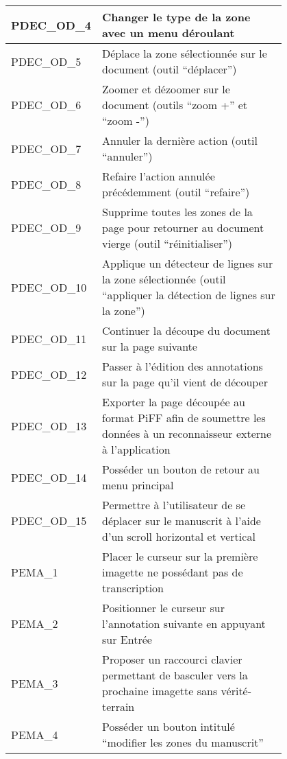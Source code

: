 \begin{center}
\begin{tabular}{ | l | p{0.8\linewidth} | }
        \hline
        \rowcolor{red}PDEC\_OD\_4 & Changer le type de la zone avec un menu déroulant \\
        \hline
        \rowcolor{red}PDEC\_OD\_5 & Déplace la zone sélectionnée sur le document (outil “déplacer”) \\
        \hline
        \rowcolor{red}PDEC\_OD\_6 & Zoomer et dézoomer sur le document (outils “zoom +” et “zoom -”) \\
        \hline
        \rowcolor{red}PDEC\_OD\_7 & Annuler la dernière action (outil “annuler”) \\
        \hline
        \rowcolor{red}PDEC\_OD\_8 & Refaire l’action annulée précédemment (outil “refaire”) \\
        \hline
        \rowcolor{red}PDEC\_OD\_9 & Supprime toutes les zones de la page pour retourner au document vierge (outil “réinitialiser”) \\
        \hline
        \rowcolor{red}PDEC\_OD\_10 & Applique un détecteur de lignes sur la zone sélectionnée (outil “appliquer la détection de lignes sur la zone”) \\
        \hline
        \rowcolor{red}PDEC\_OD\_11 & Continuer la découpe du document sur la page suivante \\
        \hline
        \rowcolor{red}PDEC\_OD\_12 & Passer à l’édition des annotations sur la page qu’il vient de découper \\
        \hline
        \rowcolor{red}PDEC\_OD\_13 & Exporter la page découpée au format PiFF afin de soumettre les données à un reconnaisseur externe à l’application \\
        \hline
        \rowcolor{red}PDEC\_OD\_14 & Posséder un bouton de retour au menu principal \\
        \hline
        \rowcolor{red}PDEC\_OD\_15 & Permettre à l’utilisateur de se déplacer sur le manuscrit à l’aide d’un scroll horizontal et vertical \\
        \hline
        PEMA\_1 & Placer le curseur sur la première imagette ne possédant pas de transcription \\
        \hline
        PEMA\_2 & Positionner le curseur sur l’annotation suivante en appuyant sur Entrée \\
        \hline
        PEMA\_3 & Proposer un raccourci clavier permettant de basculer vers la prochaine imagette sans vérité-terrain \\
        \hline
        \rowcolor{red}PEMA\_4 & Posséder un bouton intitulé “modifier les zones du manuscrit” \\

\end{tabular}
\end{center}
